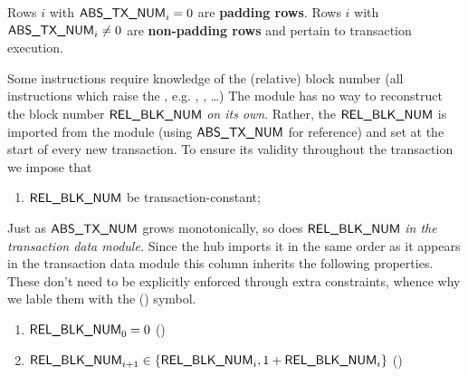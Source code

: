 Rows $i$ with $\textsf{ABS\_TX\_NUM}_{i} = 0$ are \textbf{padding rows}. Rows $i$ with $\textsf{ABS\_TX\_NUM}_{i} \neq 0$ are \textbf{non-padding rows} and pertain to transaction execution.

Some instructions require knowledge of the (relative) block number (all instructions which raise the \btcFlag{}, e.g. , , \dots{})
The \hubMod{} module has no way to reconstruct the block number $\textsf{REL\_BLK\_NUM}$ \emph{on its own}.
Rather, the $\textsf{REL\_BLK\_NUM}$ is imported from the \txnDataMod{} module (using $\textsf{ABS\_TX\_NUM}$ for reference) and set at the start of every new transaction.
To ensure its validity throughout the transaction we impose that
\begin{enumerate}[resume]
	\item \label{hub: heartbeat: transaction constancy of relative block number} $\textsf{REL\_BLK\_NUM}$ be transaction-constant;
\end{enumerate}
Just as $\textsf{ABS\_TX\_NUM}$ grows monotonically, so does $\textsf{REL\_BLK\_NUM}$ \emph{in the transaction data module.}
Since the hub imports it in the same order as it appears in the transaction data module this column inherits the following properties.
These don't need to be explicitly enforced through extra constraints, whence why we lable them with the (\trash) symbol.
\begin{enumerate}[resume]
	\item $\textsf{REL\_BLK\_NUM}_{0} = 0$ \quad (\trash)
	\item $\textsf{REL\_BLK\_NUM}_{i + 1} \in \{ \textsf{REL\_BLK\_NUM}_{i}, 1 + \textsf{REL\_BLK\_NUM}_{i} \}$ \quad (\trash)
\end{enumerate}
